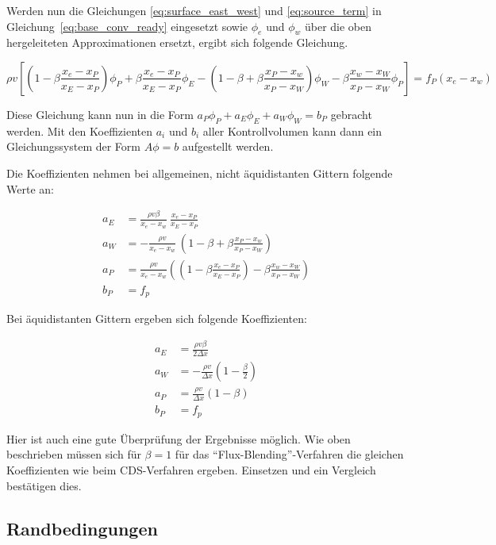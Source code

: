 \documentclass[11pt, ngerman,colorback,accentcolor=tud2d]{tudreport}
\begin{document}
Werden nun die Gleichungen \eqref{eq:surface_east_west} und \eqref{eq:source_term}
in Gleichung~\eqref{eq:base_conv_ready} eingesetzt sowie $\phi_e$ und $\phi_w$ über
die oben hergeleiteten Approximationen ersetzt, ergibt sich folgende Gleichung.

\begin{equation*}
  \rho v \left[{
    \left({1-\beta \frac{x_e-x_P}{x_E-x_P}}\right) \phi_P + \beta \frac{x_e-x_P}{x_E-x_P} \phi_E
    -\left({1-\beta + \beta \frac{x_P-x_w}{x_P-x_W}}\right) \phi_W - \beta \frac{x_w-x_W}{x_P-x_W} \phi_P
  }\right]
  = f_P(x_e-x_w)
\end{equation*}

Diese Gleichung kann nun in die Form $a_P \phi_P + a_E \phi_E + a_W \phi_W = b_P$
gebracht werden. Mit den Koeffizienten $a_i$ und $b_i$ aller Kontrollvolumen kann
dann ein Gleichungssystem der Form $A\phi = b$ aufgestellt werden.

Die Koeffizienten nehmen bei allgemeinen, nicht äquidistanten Gittern folgende Werte
an:

\begin{align*}
  a_E &= \frac{\rho v \beta}{x_e-x_w}\ \frac{x_e-x_P}{x_E-x_P}\\
  a_W &=-\frac{\rho v}{x_e-x_w}\ \left({1-\beta + \beta \frac{x_P-x_w}{x_P-x_W}}\right)\\
  a_P &= \frac{\rho v}{x_e-x_w} \left({
  \left({1-\beta \frac{x_e-x_P}{x_E-x_P}}\right)- \beta \frac{x_w-x_W}{x_P-x_W}
  }\right)\\
  b_P &= f_p
\end{align*}

Bei äquidistanten Gittern ergeben sich folgende Koeffizienten:

\begin{align*}
  a_E &= \frac{\rho v \beta}{2\Delta x}\\
  a_W &=-\frac{\rho v}{\Delta x}\left({1-\frac{\beta}{2} }\right)\\
  a_P &= \frac{\rho v}{\Delta x}(1-\beta)\\
  b_P &= f_p
\end{align*}

Hier ist auch eine gute Überprüfung der Ergebnisse möglich. Wie oben beschrieben
müssen sich für $\beta = 1$ für das ``Flux-Blending''-Verfahren die gleichen
Koeffizienten wie beim CDS-Verfahren ergeben. Einsetzen und ein Vergleich bestätigen dies.

\subsection{Randbedingungen}
\end{document}
